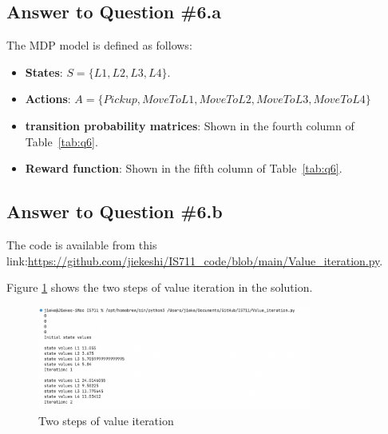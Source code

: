 \documentclass[conference]{styles/acmsiggraph}
\begin{document}
\subsection{Answer to Question \#6.a}
The MDP model is defined as follows:
\begin{itemize}[leftmargin=*]
	\setlength{\itemsep}{0pt}
	\setlength{\parsep}{0pt}
	\setlength{\parskip}{0pt}
	\item \textbf{States}: $S = \{L1, L2, L3, L4\}$.
	\item \textbf{Actions}: $A = \{Pickup, MoveToL1, MoveToL2, MoveToL3, MoveToL4\}$
	\item \textbf{transition probability matrices}: Shown in the fourth column of Table~\ref{tab:q6}.
	\item \textbf{Reward function}: Shown in the fifth column of Table~\ref{tab:q6}.
\end{itemize}


\subsection{Answer to Question \#6.b}

The code is available from this link:\url{https://github.com/jiekeshi/IS711_code/blob/main/Value_iteration.py}.

Figure \ref{fig:q6} shows the two steps of value iteration in the solution.
\begin{figure}[!h]
	\centering
	\includegraphics[width=0.8\textwidth]{figures/q6.png}
	\caption{Two steps of value iteration}
	\label{fig:q6}
\end{figure}
\end{document}
